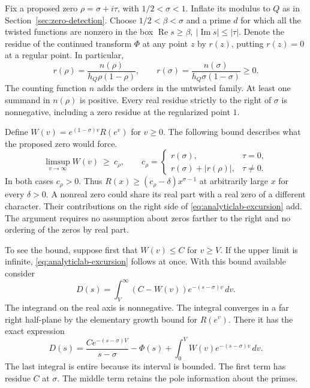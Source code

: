 \documentclass[11pt,letterpaper]{article}
\renewcommand{\Re}{\operatorname{Re}}
\renewcommand{\Im}{\operatorname{Im}}
\begin{document}
Fix a proposed zero \(\rho=\sigma+i\tau\), with \(1/2<\sigma<1\). Inflate its modulus to \(Q\) as in Section~\ref{sec:zero-detection}. Choose \(1/2<\beta<\sigma\) and a prime \(d\) for which all the twisted functions are nonzero in the box \(\Re s\ge\beta,\ |\Im s|\le|\tau|\). Denote the residue of the continued transform \(\Phi\) at any point \(z\) by \(r(z)\), putting \(r(z)=0\) at a regular point. In particular,
\[
 r(\rho)=\frac{n(\rho)}{h_Q\rho(1-\rho)},\qquad
 r(\sigma)=\frac{n(\sigma)}{h_Q\sigma(1-\sigma)}\ge0.
\]
The counting function \(n\) adds the orders in the untwisted family. At least one summand in \(n(\rho)\) is positive. Every real residue strictly to the right of \(\sigma\) is nonnegative, including a zero residue at the regularized point \(1\).

Define \(W(v)=e^{(1-\sigma)v}R(e^v)\) for \(v\ge0\). The following bound describes what the proposed zero would force.
\begin{equation}
 \limsup_{v\to\infty}W(v)\ \ge\ c_\rho,\qquad
 c_\rho=
 \begin{cases}
 r(\sigma),&\tau=0,\\[2pt]
 r(\sigma)+|r(\rho)|,&\tau\ne0 .
 \end{cases}
 \label{eq:analyticlab-excursion}
\end{equation}
In both cases \(c_\rho>0\). Thus \(R(x)\ge (c_\rho-\delta)x^{\sigma-1}\) at arbitrarily large \(x\) for every \(\delta>0\). A nonreal zero could share its real part with a real zero of a different character. Their contributions on the right side of \eqref{eq:analyticlab-excursion} add. The argument requires no assumption about zeros farther to the right and no ordering of the zeros by real part.

To see the bound, suppose first that \(W(v)\le C\) for \(v\ge V\). If the upper limit is infinite, \eqref{eq:analyticlab-excursion} follows at once. With this bound available consider
\[
 D(s)=\int_V^\infty (C-W(v))e^{-(s-\sigma)v}\,dv .
\]
The integrand on the real axis is nonnegative. The integral converges in a far right half-plane by the elementary growth bound for \(R(e^v)\). There it has the exact expression
\begin{equation}
 D(s)=\frac{C e^{-(s-\sigma)V}}{s-\sigma}-\Phi(s)
       +\int_0^V W(v)e^{-(s-\sigma)v}\,dv .
 \label{eq:analyticlab-tail-transform}
\end{equation}
The last integral is entire because its interval is bounded. The first term has residue \(C\) at \(\sigma\). The middle term retains the pole information about the primes.
\end{document}
